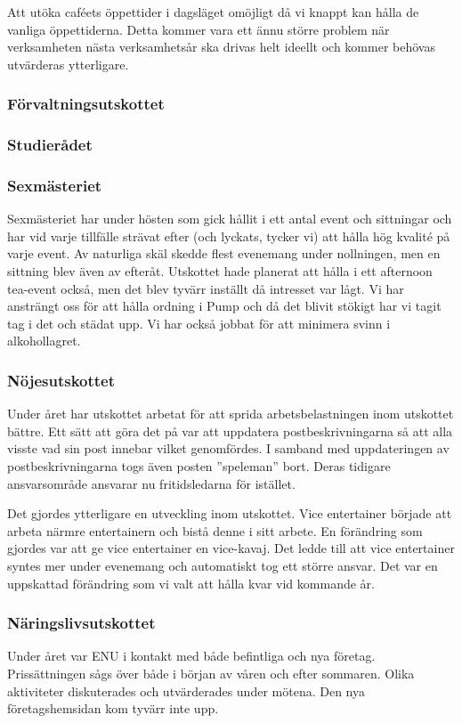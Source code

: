 \documentclass[../_main/handlingar.tex]{subfiles}
\begin{document}
Att utöka caféets öppettider i dagsläget omöjligt då vi knappt kan hålla de vanliga öppettiderna. Detta kommer vara ett ännu större problem när verksamheten nästa verksamhetsår ska drivas helt ideellt och kommer behövas utvärderas ytterligare.

\subsubsection*{Förvaltningsutskottet}

\subsubsection*{Studierådet}

\subsubsection*{Sexmästeriet}
Sexmästeriet har under hösten som gick hållit i ett antal event och sittningar och har vid varje tillfälle
strävat efter (och lyckats, tycker vi) att hålla hög kvalité på varje event. Av naturliga skäl skedde flest
evenemang under nollningen, men en sittning blev även av efteråt. Utskottet hade planerat att hålla i
ett afternoon tea-event också, men det blev tyvärr inställt då intresset var lågt. Vi har ansträngt oss för
att hålla ordning i Pump och då det blivit stökigt har vi tagit tag i det och städat upp. Vi har också jobbat
för att minimera svinn i alkohollagret.

\subsubsection*{Nöjesutskottet}
Under året har utskottet arbetat för att sprida arbetsbelastningen inom utskottet bättre. Ett
sätt att göra det på var att uppdatera postbeskrivningarna så att alla visste vad sin post
innebar vilket genomfördes. I samband med uppdateringen av postbeskrivningarna togs
även posten ”speleman” bort. Deras tidigare ansvarsområde ansvarar nu fritidsledarna för
istället.

Det gjordes ytterligare en utveckling inom utskottet. Vice entertainer började att arbeta
närmre entertainern och bistå denne i sitt arbete. En förändring som gjordes var att ge vice
entertainer en vice-kavaj. Det ledde till att vice entertainer syntes mer under evenemang
och automatiskt tog ett större ansvar. Det var en uppskattad förändring som vi valt att hålla
kvar vid kommande år.

\subsubsection*{Näringslivsutskottet}
Under året var ENU i kontakt med både befintliga och nya företag. Prissättningen sågs
över både i början av våren och efter sommaren. Olika aktiviteter diskuterades och
utvärderades under mötena. Den nya företagshemsidan kom tyvärr inte upp.
\end{document}
